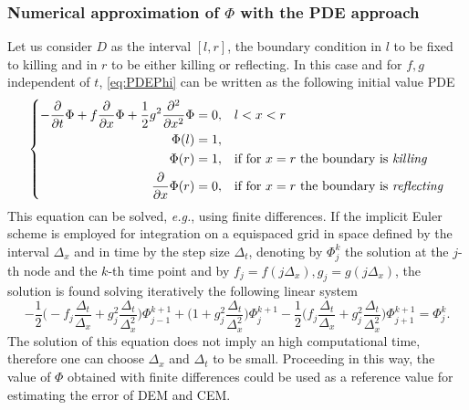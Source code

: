 \subsubsection{Numerical approximation of $\Phi$ with the PDE approach}

Let us consider $D$ as the interval $\left[ l,r \right]$, the boundary condition in $l$ to be fixed to killing and in $r$ to be either killing or reflecting. In this case and for $f,g$ independent of $t$, \eqref{eq:PDEPhi} can be written as the following initial value PDE 
\begin{equation}\label{eq:PDEPhiOneD}
\left \{
\begin{aligned}
	-\frac{\partial}{\partial t} \Phi + f\frac{\partial}{\partial x} \Phi + \frac{1}{2}g^2 \frac{\partial^2}{\partial x^2} \Phi &= 0, && l < x < r \\
	\Phi(l) &= 1, \\
	\Phi(r) &= 1, && \text{if for $x = r$ the boundary is \textit{killing}} \\
	\frac{\partial}{\partial x}\Phi(r) &= 0, && \text{if for $x = r$ the boundary is \textit{reflecting}} \\
\end{aligned} \right .
\end{equation}
This equation can be solved, \textit{e.g.}, using finite differences. If the implicit Euler scheme is employed for integration on a equispaced grid in space defined by the interval $\Delta_x$ and in time by the step size $\Delta_t$, denoting by $\Phi_j^k$ the solution at the $j$-th node and the $k$-th time point and by $f_j = f(j\Delta_x), g_j = g(j\Delta_x)$, the solution is found solving iteratively the following linear system
\begin{equation}\label{eq:FDPhi}
	- \frac{1}{2}\Big(-f_j \frac{\Delta_t}{\Delta_x} + g_j^2 \frac{\Delta_t}{\Delta_x^2}\Big)\Phi_{j-1}^{k+1} + \Big(1 + g_j^2 \frac{\Delta_t}{\Delta_x^2}\Big)\Phi_j^{k+1} - \frac{1}{2}\Big(f_j \frac{\Delta_t}{\Delta_x} + g_j^2 \frac{\Delta_t}{\Delta_x^2}\Big)\Phi_{j+1}^{k+1}  = \Phi_j^k.
\end{equation}
The solution of this equation does not imply an high computational time, therefore one can choose $\Delta_x$ and $\Delta_t$ to be small. Proceeding in this way, the value of $\Phi$ obtained with finite differences could be used as a reference value for estimating the error of DEM and CEM.
